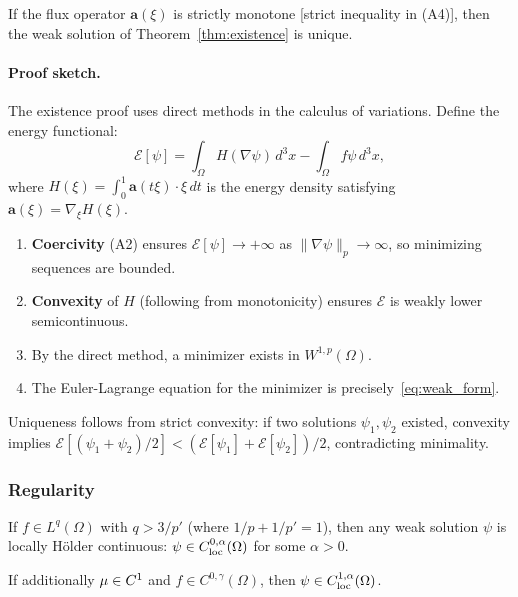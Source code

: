 \begin{theorem}[Uniqueness]\label{thm:uniqueness}
If the flux operator $\mathbf{a}(\xi)$ is strictly monotone [strict 
inequality in (A4)], then the weak solution of Theorem~\ref{thm:existence} 
is unique.
\end{theorem}

\paragraph{Proof sketch.}
The existence proof uses direct methods in the calculus of variations. 
Define the energy functional:
\begin{equation}
\mathcal{E}[\psi] = \int_\Omega H(\nabla\psi)\,d^3x - \int_\Omega f\psi\,d^3x,
\label{eq:energy_functional}
\end{equation}
where $H(\xi) = \int_0^1 \mathbf{a}(t\xi)\cdot\xi\,dt$ is the energy density 
satisfying $\mathbf{a}(\xi) = \nabla_\xi H(\xi)$.

\begin{enumerate}
\item \textbf{Coercivity} (A2) ensures $\mathcal{E}[\psi] \to +\infty$ as 
$\|\nabla\psi\|_p \to \infty$, so minimizing sequences are bounded.
\item \textbf{Convexity} of $H$ (following from monotonicity) ensures 
$\mathcal{E}$ is weakly lower semicontinuous.
\item By the direct method, a minimizer exists in $W^{1,p}(\Omega)$.
\item The Euler-Lagrange equation for the minimizer is precisely~\eqref{eq:weak_form}.
\end{enumerate}

Uniqueness follows from strict convexity: if two solutions $\psi_1, \psi_2$ 
existed, convexity implies $\mathcal{E}[(\psi_1+\psi_2)/2] < 
(\mathcal{E}[\psi_1] + \mathcal{E}[\psi_2])/2$, contradicting minimality.

\subsubsection{Regularity}

\begin{theorem}[Regularity]\label{thm:regularity}
If $f \in L^q(\Omega)$ with $q > 3/p'$ (where $1/p + 1/p' = 1$), then 
any weak solution $\psi$ is locally H\"older continuous: 
$\psi \in C^{0,\alpha}_{\rm loc}(\Omega)$ for some $\alpha > 0$.

If additionally $\mu \in C^1$ and $f \in C^{0,\gamma}(\Omega)$, 
then $\psi \in C^{1,\alpha}_{\rm loc}(\Omega)$.
\end{theorem}


